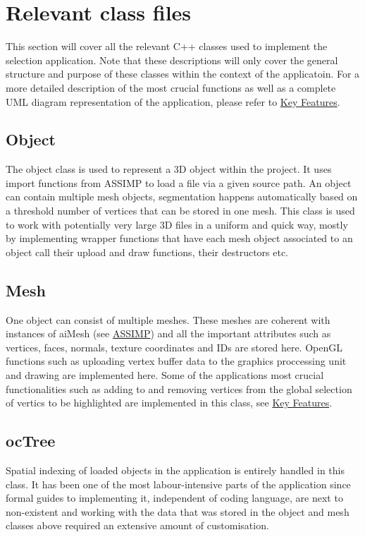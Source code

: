 \section{Relevant class files}
\label{sec:relevant_class_files}

This section will cover all the relevant C++ classes used to implement the selection application. Note that these descriptions will only cover the general structure and purpose of these classes within the context of the applicatoin. For a more detailed description of the most crucial functions as well as a complete UML diagram representation of the application, please refer to \hyperref[sec:key_features]{Key Features}.

\subsection{Object}
\label{sec:object}

The object class is used to represent a 3D object within the project. It uses import functions from ASSIMP to load a file via a given source path. An object can contain multiple mesh objects, segmentation happens automatically based on a threshold number of vertices that can be stored in one mesh. This class is used to work with potentially very large 3D files in a uniform and quick way, mostly by implementing wrapper functions that have each mesh object associated to an object call their upload and draw functions, their destructors etc.

\subsection{Mesh}
\label{sec:mesh}

One object can consist of multiple meshes. These meshes are coherent with instances of aiMesh (see \hyperref[sec:assimp]{ASSIMP}) and all the important attributes such as vertices, faces, normals, texture coordinates and IDs are stored here. OpenGL functions such as uploading vertex buffer data to the graphics proccessing unit and drawing are implemented here. Some of the applications most crucial functionalities such as adding to and removing vertices from the global selection of vertics to be highlighted are implemented in this class, see \hyperref[sec:key_features]{Key Features}.

\subsection{ocTree}
\label{sec:octree}
Spatial indexing of loaded objects in the application is entirely handled in this class. It has been one of the most labour-intensive parts of the application since formal guides to implementing it, independent of coding language, are next to non-existent and working with the data that was stored in the object and mesh classes above required an extensive amount of customisation.

